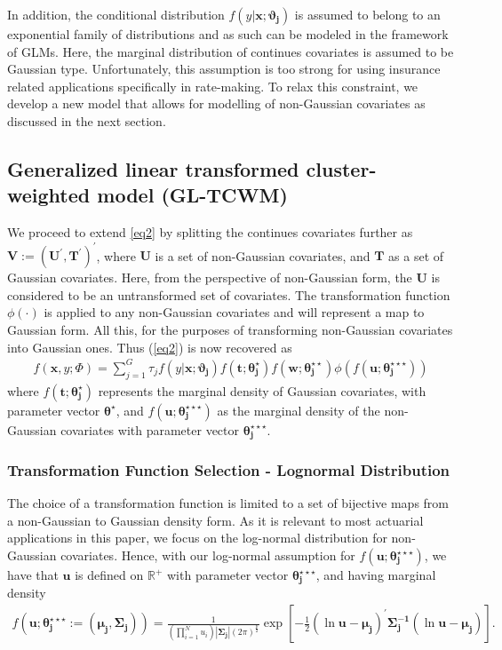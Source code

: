 \documentclass[11pt,letterpaper]{article}
\numberwithin{equation}{section}
\numberwithin{equation}{section}
\numberwithin{equation}{section}
\begin{document}
In addition, the conditional distribution $f(y|\bm{x};\bm{\vartheta_j})$ is assumed to belong to an exponential family of distributions and as such can be modeled in the framework of GLMs. Here, the marginal distribution of continues covariates is assumed to be Gaussian type. Unfortunately, this assumption is too strong for using insurance related applications specifically in rate-making. To relax this constraint, we develop a new model that allows for modelling of non-Gaussian covariates as discussed in the next section.

\subsection{Generalized linear transformed cluster-weighted model (GL-TCWM) }
We proceed to extend \eqref{eq2} by splitting the  continues covariates further as $\bm{V}:=(\bm U^{'}, \bm T^{'})^{'}$, where $\bm{U}$ is a set of non-Gaussian covariates, and $\bm{T}$ as a set of Gaussian  covariates. Here, from the perspective of non-Gaussian form, the $\bm{U}$ is considered to be an untransformed set of covariates. The transformation function $\phi(\cdot )$ is applied to any non-Gaussian covariates and will represent a map to Gaussian form. All this, for the purposes of transforming non-Gaussian covariates into Gaussian ones.  Thus (\ref{eq2}) is now recovered as
\begin{align}
 f(\bm x, y; \Phi)= \sum_{j=1}^{G} \tau_j f(y|\bm{x};\bm{\vartheta_j})f(\bm{t};\bm{\theta_j^{\star}})f(\bm{w};\bm{\theta_j^{\star\star}})\phi(f(\bm{u};\bm{\theta_j^{\star\star\star}}))
\label{eq3}
\end{align}
where $f(\bm{t};\bm{\theta_j^{\star}})$ represents the marginal density of Gaussian covariates, with parameter vector $\bm{\theta^{\star}}$, and $f(\bm{u};\bm{\theta_j^{\star\star\star}})$ as the marginal density of the non-Gaussian covariates with parameter vector $ \bm{ \theta_j^{\star\star\star}} $.

\subsubsection{Transformation Function Selection - Lognormal Distribution}
The choice of a transformation function is limited to a set of bijective maps from a non-Gaussian to Gaussian density form. 
As it is relevant to most actuarial applications in this paper, we focus on the  log-normal distribution  for non-Gaussian covariates. Hence, with our log-normal assumption for $f(\bm{u};\bm{\theta_j^{\star\star\star}})$, we have that $\bm{u}$ is defined on $\mathbb{R}^+$ with parameter vector $ \bm{\theta_j^{\star\star\star}} $, and having marginal density
\begin{align} f \left(  \bm{u}; \bm{\theta_j^{\star\star\star}} := ( \bm{\mu_j} ,\bm{ \Sigma _j } ) \right) = \frac{1}{(\prod_{i=1}^{N}u_{i})|\bm{ \Sigma_j} |(2 \pi)^{\frac{p}{2}}}   \exp\left[-\frac{1}{2}(\ln\bm{ u}-\bm{\mu_j})^{'}\bm{\Sigma_j^{-1}}(\ln \bm {u}-\bm{\mu_j})\right].
\end{align}
\end{document}
